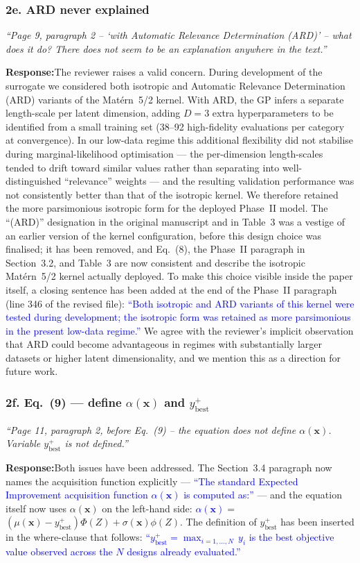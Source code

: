 \documentclass[11pt,a4paper]{article}
\newcommand{\new}[1]{\textcolor{blue}{#1}}
\newcommand{\rev}[1]{\par\noindent\textit{\small #1}\par\smallskip}
\newcommand{\resp}{\par\noindent\textbf{Response:}\space}
\begin{document}
\subsubsection*{2e. ARD never explained}
\rev{``Page 9, paragraph 2 -- `with Automatic Relevance Determination (ARD)' -- what does it do? There does not seem to be an explanation anywhere in the text.''}
\resp The reviewer raises a valid concern. During development of the surrogate we considered both isotropic and Automatic Relevance Determination (ARD) variants of the Mat\'ern~5/2 kernel. With ARD, the GP infers a separate length-scale per latent dimension, adding $D=3$ extra hyperparameters to be identified from a small training set (38--92 high-fidelity evaluations per category at convergence). In our low-data regime this additional flexibility did not stabilise during marginal-likelihood optimisation --- the per-dimension length-scales tended to drift toward similar values rather than separating into well-distinguished ``relevance'' weights --- and the resulting validation performance was not consistently better than that of the isotropic kernel. We therefore retained the more parsimonious isotropic form for the deployed Phase~II model. The ``(ARD)'' designation in the original manuscript and in Table~3 was a vestige of an earlier version of the kernel configuration, before this design choice was finalised; it has been removed, and Eq.~(8), the Phase~II paragraph in Section~3.2, and Table~3 are now consistent and describe the isotropic Mat\'ern~5/2 kernel actually deployed. To make this choice visible inside the paper itself, a closing sentence has been added at the end of the Phase~II paragraph (line 346 of the revised file): \new{``Both isotropic and ARD variants of this kernel were tested during development; the isotropic form was retained as more parsimonious in the present low-data regime.''} We agree with the reviewer's implicit observation that ARD could become advantageous in regimes with substantially larger datasets or higher latent dimensionality, and we mention this as a direction for future work.

\subsubsection*{2f. Eq.~(9) --- define $\alpha(\mathbf{x})$ and $y_{\text{best}}^+$}
\rev{``Page 11, paragraph 2, before Eq.~(9) -- the equation does not define $\alpha(\mathbf{x})$. Variable $y_{\text{best}}^+$ is not defined.''}
\resp Both issues have been addressed. The Section~3.4 paragraph now names the acquisition function explicitly --- \new{``The standard Expected Improvement acquisition function $\alpha(\mathbf{x})$ is computed as:''} --- and the equation itself now uses $\alpha(\mathbf{x})$ on the left-hand side: \new{$\alpha(\mathbf{x}) =$}$(\mu(\mathbf{x}) - y_{\text{best}}^+)\Phi(Z) + \sigma(\mathbf{x})\phi(Z)$. The definition of $y_{\text{best}}^+$ has been inserted in the where-clause that follows: \new{``$y_{\text{best}}^+ = \max_{i=1,\dots,N}\, y_i$ is the best objective value observed across the $N$ designs already evaluated.''}
\end{document}
